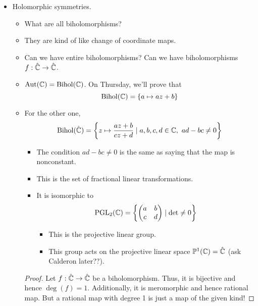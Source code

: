 \documentclass[../notes.tex]{subfiles}
\begin{document}
\begin{itemize}
    \item Holomorphic symmetries.
    \begin{itemize}
        \item What are all biholomorphisms?
        \item They are kind of like change of coordinate maps.
        \item Can we have entire biholomorphisms? Can we have biholomorphisms $f:\hat{\mathbb{C}}\to\hat{\mathbb{C}}$.
        \item $\operatorname{Aut}(\mathbb{C})=\operatorname{Bihol}(\mathbb{C})$. On Thursday, we'll prove that
        \begin{equation*}
            \operatorname{Bihol}(\mathbb{C}) = \{a\mapsto az+b\}
        \end{equation*}
        \item For the other one,
        \begin{equation*}
            \operatorname{Bihol}(\hat{\mathbb{C}}) = \left\{ z\mapsto\frac{az+b}{cz+d}\mid a,b,c,d\in\mathbb{C},\ ad-bc\neq 0 \right\}
        \end{equation*}
        \begin{itemize}
            \item The condition $ad-bc\neq 0$ is the same as saying that the map is nonconstant.
            \item This is the set of fractional linear transformations.
            \item It is isomorphic to
            \begin{equation*}
                \operatorname{PGL}_2(\mathbb{C}) = \left\{
                    \begin{pmatrix}
                        a & b\\
                        c & d\\
                    \end{pmatrix}
                    \mid \det\neq 0
                \right\}
            \end{equation*}
            \begin{itemize}
                \item This is the projective linear group.
                \item This group acts on the projective linear space $\mathbb{P}^1(\mathbb{C})=\hat{\mathbb{C}}$ (ask Calderon later??).
            \end{itemize}
        \end{itemize}
        \begin{proof}
            Let $f:\hat{\mathbb{C}}\to\hat{\mathbb{C}}$ be a biholomorphism. Thus, it is bijective and hence $\deg(f)=1$. Additionally, it is meromorphic and hence rational map. But a rational map with degree 1 is just a map of the given kind!

\end{proof}
\end{itemize}
\end{itemize}
\end{document}
